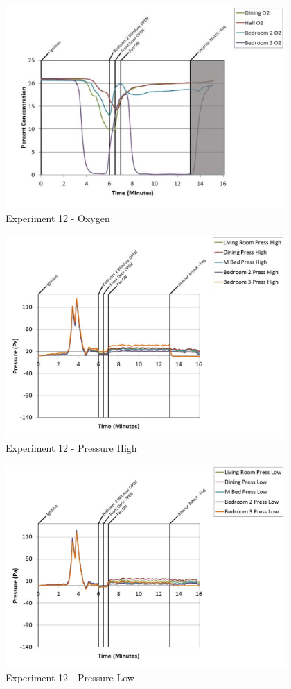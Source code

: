 \documentclass{article}
\begin{document}
\begin{appendices}
	\clearpage

	\begin{figure}[h!]
		\centering
		\includegraphics[height=3.05in]{0_Images/Results_Charts/Exp_12_Charts/Oxygen.pdf}
		\caption{Experiment 12 - Oxygen}
	\end{figure}
 

	\begin{figure}[h!]
		\centering
		\includegraphics[height=3.05in]{0_Images/Results_Charts/Exp_12_Charts/PressureHigh.pdf}
		\caption{Experiment 12 - Pressure High}
	\end{figure}
 
	\clearpage

	\begin{figure}[h!]
		\centering
		\includegraphics[height=3.05in]{0_Images/Results_Charts/Exp_12_Charts/PressureLow.pdf}
		\caption{Experiment 12 - Pressure Low}
	\end{figure}
 


\end{appendices}
\end{document}
